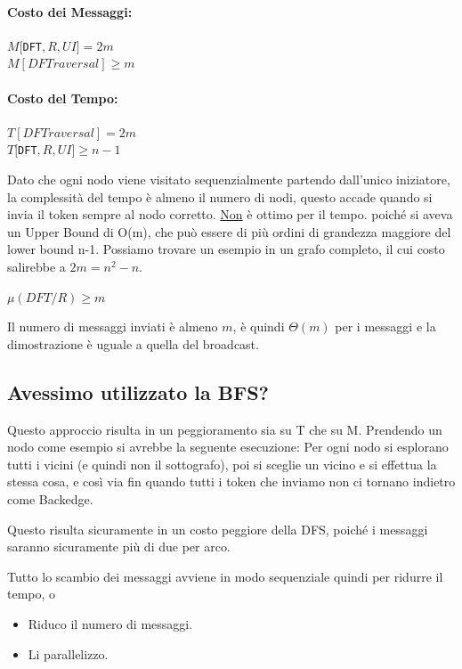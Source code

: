 \paragraph{Costo dei Messaggi:}

\begin{center}
    $M[$\texttt{DFT}$,R,UI] = 2m ~~$\\
    $M[DFTraversal] \geq m$
\end{center}

\paragraph{Costo del Tempo:}

\begin{center}
    $T[DFTraversal] = 2m$\\
    $T[$\texttt{DFT}$,R,UI] \geq n-1 $
\end{center}

Dato che ogni nodo viene visitato sequenzialmente partendo dall'unico
iniziatore, la complessità del tempo è almeno il numero di nodi, questo accade
quando si invia il token sempre al nodo corretto. \underline{Non} è ottimo per
il tempo. poiché si aveva un Upper Bound di O(m), che può essere di più ordini
di grandezza maggiore del lower bound n-1. Possiamo trovare un esempio in un
grafo completo, il cui costo salirebbe a $2m=n^2-n$.

\begin{center}
    $\mu(DFT/R) \geq m$
\end{center}
Il numero di messaggi inviati è almeno $m$, è quindi $\Theta(m)$ per i messaggi
e la dimostrazione è uguale a quella del broadcast.

\subsection{Avessimo utilizzato la BFS?}
Questo approccio risulta in un peggioramento sia su T che su M. Prendendo un
nodo come esempio si avrebbe la seguente esecuzione: Per ogni nodo si esplorano
tutti i vicini (e quindi non il sottografo), poi si sceglie un vicino e si
effettua la stessa cosa, e così via fin quando tutti i token che inviamo non ci
tornano indietro come Backedge.

Questo risulta sicuramente in un costo peggiore della DFS, poiché i messaggi
saranno sicuramente più di due per arco.

Tutto lo scambio dei messaggi avviene in modo sequenziale quindi per ridurre il
tempo, o
\begin{itemize}
    \item Riduco il numero di messaggi.
    \item Li parallelizzo.
\end{itemize}

